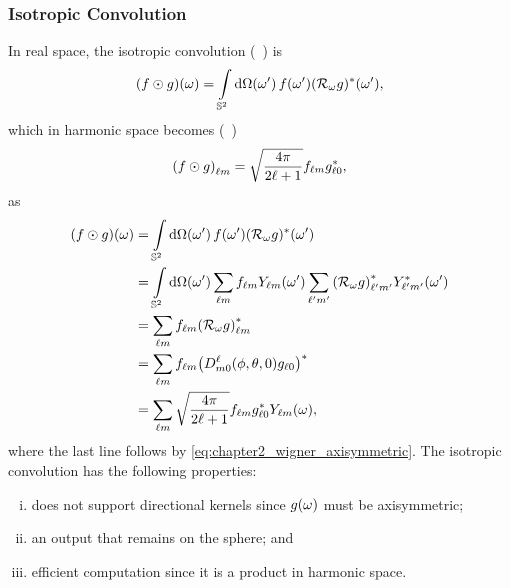 \subsubsection{Isotropic Convolution}

In real space, the isotropic convolution (\eg{}~\cite{McEwen2007,Wei2011,Kennedy2011}) is
%
\begin{equation}
	\pixel{(f \odot g)}
	= \integrateSphere{\omega'} \pixel[']{f} \pixel[']{\conj{(\rotation{\omega}g)}},
\end{equation}
%
which in harmonic space becomes (\eg{}~\cite{McEwen2007})
%
\begin{equation}\label{eq:chapter3_isotropic_harmonic}
	\harmonic{(f \odot g)}
	= \sqrt{\inverseFactor} \harmonic{f} \conj{\axiHarmonic{g}},
\end{equation}
%
as
%
\begin{align}
	\pixel{(f \odot g)}
	 & = \integrateSphere{\omega'} \pixel[']{f} \pixel[']{\conj{(\rotation{\omega}g)}} \nonumber{}                                                                                           \\
	 & = \integrateSphere{\omega'} \harmonicSum \harmonic{f} \pixel[']{\harmonic{Y}} \harmonicSum['] \conj{\harmonic[']{(\rotation{\omega}g)}} \pixel[']{\conj{\harmonic[']{Y}}} \nonumber{} \\
	 & = \harmonicSum \harmonic{f} \conj{\harmonic{(\rotation{\omega}g)}} \nonumber                                                                                                          \\
	 & = \harmonicSum \harmonic{f} \conj{\big(\wigner{\ell}{m}{0}(\phi,\theta,0) \axiHarmonic{g}\big)} \nonumber{}                                                                           \\
	 & = \harmonicSum \sqrt{\inverseFactor} \harmonic{f} \conj{\axiHarmonic{g}} \pixel{\harmonic{Y}},
\end{align}
%
where the last line follows by \cref{eq:chapter2_wigner_axisymmetric}.
The isotropic convolution has the following properties:
%
\begin{enumerate}[(i),nosep,left=\parindent]
	\item does not support directional kernels since \(\pixel{g}\) must be axisymmetric;
	\item an output that remains on the sphere; and
	\item efficient computation since it is a product in harmonic space.
\end{enumerate}

